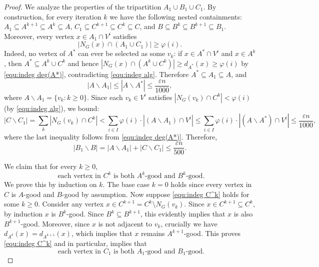 \documentclass{aic}
\begin{document}
\begin{proof}
		We analyze the properties of the tripartition $A_1 \cup B_1 \cup C_1$.
		By construction, for every iteration $k$ we have the following nested containments: $A_1\subseteq A^{k+1}\subseteq A^k\subseteq A$,
		$C_1\subseteq C^{k+1}\subseteq C^k\subseteq C$, and $B\subseteq B^k\subseteq B^{k+1}\subseteq B_1$.
		Moreover, every vertex $x\in A_1\cap V^i$ satisfies
		\begin{equation}
			\label{equ:indeg A'}
			|N_G(x)\cap (A_1\cup C_1)|\ge \varphi(i).
		\end{equation}
		Indeed, no vertex of $A^*$ can ever be selected as some $v_k$: if $x\in A^*\cap V^i$ and $x\in A^k$, then $A^*\subseteq A^k\cup C^k$ and hence
		$|N_G(x)\cap (A^k\cup C^k)|\ge d_{A^*}(x)\ge \varphi(i)$ by \eqref{equ:indeg deg(A*)}, contradicting \eqref{equ:indeg alg}.
		Therefore $A^*\subseteq A_1\subseteq A$, and
		\begin{equation}
			\label{equ:indeg A-A'}
			|A\backslash A_1|\le |A\backslash A^*|\le \frac{\varepsilon n}{1000},
		\end{equation}
		where $A\backslash A_1=\{v_k:k\ge 0\}$.
		Since each $v_k \in V^i$ satisfies $|N_G(v_k) \cap C^k| < \varphi(i)$ (by \eqref{equ:indeg alg}), we bound:
		\begin{equation}
			\label{equ:indeg C-C'}
			|C\backslash C_1|=\sum_{k} |N_G(v_k)\cap C^k|<\sum_{i\in I} \varphi(i)\cdot |(A\backslash A_1)\cap V^i|\le
			\sum_{i\in I} \varphi(i)\cdot |(A\backslash A^*)\cap V^i|\le \frac{\varepsilon n}{1000},
		\end{equation}
		where the last inequality follows from \eqref{equ:indeg deg(A*)}. Therefore,
		\begin{equation}
			\label{equ:indeg B'-B}
			|B_1\backslash B|=|A\backslash A_1|+|C\backslash C_1| \le \frac{\varepsilon n}{500}.
		\end{equation}
		
		We claim that for every $k\geq 0$,
		\begin{equation}
			\label{equ:indeg C^k}
			\text{ each vertex in } C^k \text{ is both } A^k\text{-good  and } B^k\text{-good}.
		\end{equation}
		We prove this by induction on $k$. The base case $k=0$ holds since every vertex in $C$ is $A$-good and $B$-good by assumption.
		Now suppose \eqref{equ:indeg C^k} holds for some $k \geq 0$. Consider any vertex $x \in C^{k+1} = C^k \setminus N_G(v_k)$.
		Since $x\in C^{k+1}\subseteq C^k$, by induction $x$ is $B^k$-good.
		Since $B^k \subseteq B^{k+1}$, this evidently implies that $x$ is also $B^{k+1}$-good.
		Moreover, since $x$ is not adjacent to $v_k$, crucially we have $d_{A^k}(x) = d_{A^{k+1}}(x)$,
		which implies that $x$ remains $A^{k+1}$-good.
		This proves \eqref{equ:indeg C^k} and in particular, implies that
		\begin{equation}
			\label{equ:indeg C'}
			\text{ each vertex in } C_1 \text{ is both } A_1\text{-good  and } B_1\text{-good}.
		\end{equation}
		

\end{proof}
\end{document}
